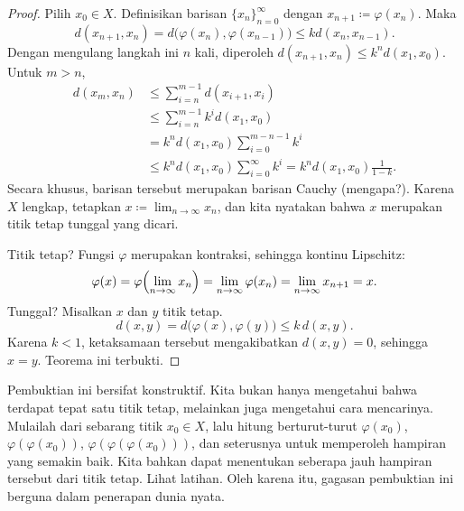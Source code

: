 \begin{proof}
Pilih $x_0 \in X$.
Definisikan barisan $\{ x_n \}_{n=0}^\infty$ dengan $x_{n+1} \coloneqq \varphi(x_n)$.  Maka
\begin{equation*}
d(x_{n+1},x_n) = d\bigl(\varphi(x_n),\varphi(x_{n-1})\bigr)
\leq k d(x_n,x_{n-1}) .
\end{equation*}
Dengan mengulang langkah ini $n$ kali, diperoleh $d(x_{n+1},x_n) \leq k^n d(x_1,x_0)$.
Untuk $m > n$,
\begin{equation*}
\begin{split}
d(x_m,x_n)
& \leq \sum_{i=n}^{m-1} d(x_{i+1},x_i) \\
& \leq \sum_{i=n}^{m-1} k^i d(x_1,x_0) \\
& = k^n d(x_1,x_0) \sum_{i=0}^{m-n-1} k^i \\
& \leq k^n d(x_1,x_0) \sum_{i=0}^{\infty} k^i
= k^n d(x_1,x_0) \frac{1}{1-k} .
\end{split}
\end{equation*}
Secara khusus, barisan tersebut merupakan barisan Cauchy (mengapa?).  Karena $X$ lengkap,
tetapkan $x \coloneqq \lim_{n\to\infty} x_n$, dan kita nyatakan bahwa $x$
merupakan titik tetap tunggal yang dicari.

Titik tetap?  Fungsi $\varphi$ merupakan kontraksi,
sehingga kontinu Lipschitz:
\begin{equation*}
\varphi(x) = \varphi\Bigl( \lim_{n\to\infty} x_n\Bigr) = \lim_{n\to\infty}
\varphi(x_n) =
\lim_{n\to\infty} x_{n+1} = x .
\end{equation*}
Tunggal?  Misalkan $x$ dan $y$ titik tetap.
\begin{equation*}
d(x,y) = d\bigl(\varphi(x),\varphi(y)\bigr) \leq k\, d(x,y) .
\end{equation*}
Karena $k < 1$, ketaksamaan tersebut mengakibatkan $d(x,y) = 0$, sehingga $x=y$.  Teorema ini
terbukti.
\end{proof}

Pembuktian ini bersifat konstruktif.  Kita bukan hanya mengetahui bahwa 
terdapat tepat satu titik tetap, melainkan juga mengetahui cara mencarinya.  Mulailah dari
sebarang titik $x_0 \in X$, lalu hitung berturut-turut $\varphi(x_0)$,
$\varphi(\varphi(x_0))$,
$\varphi(\varphi(\varphi(x_0)))$, dan seterusnya untuk memperoleh hampiran yang semakin baik.
Kita bahkan dapat menentukan seberapa jauh
hampiran tersebut dari titik tetap.
Lihat latihan.  Oleh karena itu, gagasan pembuktian ini
berguna dalam penerapan dunia nyata.

